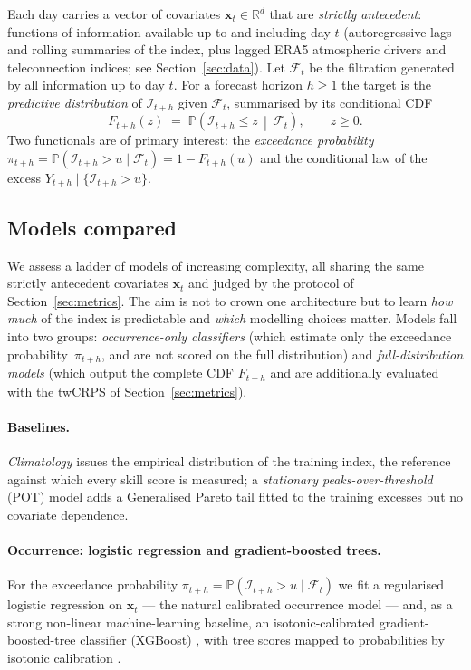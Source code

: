\documentclass[11pt,a4paper]{article}
\newcommand{\Ind}{\mathcal{I}}                 %
\newcommand{\Real}{\mathbb{R}}
\newcommand{\Prob}{\mathbb{P}}
\newcommand{\bx}{\bm{x}}
\newcommand{\Filt}{\mathcal{F}}
\begin{document}
Each day carries a vector of covariates $\bx_t\in\Real^d$ that are
\emph{strictly antecedent}: functions of information available up to and
including day $t$ (autoregressive lags and rolling summaries of the index, plus
lagged ERA5 atmospheric drivers and teleconnection indices; see
Section~\ref{sec:data}). Let $\Filt_t$ be the filtration generated by all
information up to day $t$. For a forecast horizon $h\ge 1$ the target is the
\emph{predictive distribution} of $\Ind_{t+h}$ given $\Filt_t$, summarised by
its conditional CDF
\begin{equation}
F_{t+h}(z) \;=\; \Prob\!\left(\Ind_{t+h} \le z \,\middle|\, \Filt_t\right),
\qquad z\ge 0 .
\end{equation}
Two functionals are of primary interest: the \emph{exceedance probability}
$\pi_{t+h}=\Prob(\Ind_{t+h}>u\mid\Filt_t)=1-F_{t+h}(u)$ and the conditional law
of the excess $Y_{t+h}\mid\{\Ind_{t+h}>u\}$.

\subsection{Models compared}\label{sec:models}
We assess a ladder of models of increasing complexity, all sharing the same
strictly antecedent covariates $\bx_t$ and judged by the protocol of
Section~\ref{sec:metrics}. The aim is not to crown one architecture but to learn
\emph{how much} of the index is predictable and \emph{which} modelling choices
matter.
Models fall into two groups: \emph{occurrence-only classifiers} (which estimate only the exceedance probability~$\pi_{t+h}$, and are not scored on the full distribution) and \emph{full-distribution models} (which output the complete CDF $F_{t+h}$ and are additionally evaluated with the twCRPS of Section~\ref{sec:metrics}).

\paragraph{Baselines.} \emph{Climatology} issues the empirical distribution of
the training index, the reference against which every skill score is measured; a
\emph{stationary peaks-over-threshold} (POT) model adds a Generalised Pareto tail \citep{davison1990}
fitted to the training excesses but no covariate dependence.

\paragraph{Occurrence: logistic regression and gradient-boosted trees.} For the
exceedance probability $\pi_{t+h}=\Prob(\Ind_{t+h}>u\mid\Filt_t)$ we fit a
regularised logistic regression on $\bx_t$ --- the natural calibrated occurrence
model --- and, as a strong non-linear machine-learning baseline, an
isotonic-calibrated gradient-boosted-tree classifier (XGBoost) \citep{chen2016xgboost,friedman2001boosting}, with tree scores mapped to probabilities by isotonic calibration \citep{zadrozny2002calibration}.
\end{document}
